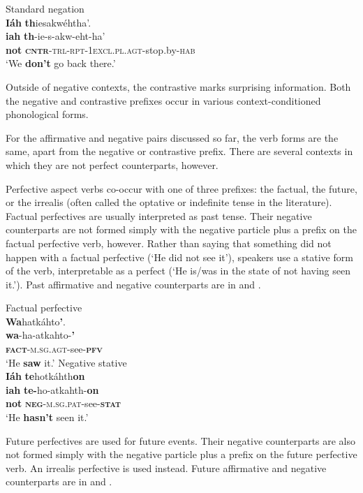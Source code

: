 \documentclass[output=paper,colorlinks,citecolor=brown]{langscibook}
\begin{document}
{\ea\label{ex:moh:16} Standard negation\\
    \glll \textbf{Iáh} \textbf{th}iesakwéhtha’. \\
         \textbf{iah} \textbf{th}-ie-s-akw-eht-ha’\\
         \textbf{not} \textsc{\textbf{cntr}-trl-rpt-1excl.pl.agt}-stop.by-\textsc{hab} \\
    \glt ‘We \textbf{don’t} go back there.’
\z}

Outside of negative contexts, the contrastive marks surprising information. Both the negative and contrastive prefixes occur in various context-conditioned phonological forms.

For the affirmative and negative pairs discussed so far, the verb forms are the same, apart from the negative or contrastive prefix. There are several contexts in which they are not perfect counterparts, however.

Perfective aspect verbs co-occur with one of three prefixes: the factual, the future, or the irrealis (often called the optative or indefinite tense in the literature). Factual perfectives are usually interpreted as past tense. Their negative counterparts are not formed simply with the negative particle plus a prefix on the factual perfective verb, however. Rather than saying that something did not happen with a factual perfective (‘He did not see it’), speakers use a stative form of the verb, interpretable as a perfect (‘He is/was in the state of not having seen it.’). Past affirmative and negative counterparts are in  and .

\ea\label{ex:moh:17} Factual perfective\\ 
    \glll \textbf{Wa}hatkáhto\textbf{’}.\\
         \textbf{wa}-ha-atkahto-\textbf{’}\\
         \textbf{\textsc{fact}}-\textsc{m.sg.agt}-see-\textbf{\textsc{pfv}} \\
    \glt ‘He \textbf{saw} it.’
\z
\ea\label{ex:moh:18} Negative stative\\
    \glll \textbf{Iáh} \textbf{te}hotkáhth\textbf{on} \\
         \textbf{iah} \textbf{te-}ho-atkahth-\textbf{on}\\
         \textbf{not} \textbf{\textsc{neg}}\textsc{-m.sg.pat}-see\textsc{-}\textbf{\textsc{stat}} \\
    \glt ‘He \textbf{hasn’t} seen it.’
\z

Future perfectives are used for future events. Their negative counterparts are also not formed simply with the negative particle plus a prefix on the future perfective verb. An irrealis perfective is used instead. Future affirmative and negative counterparts are in  and .
\end{document}
